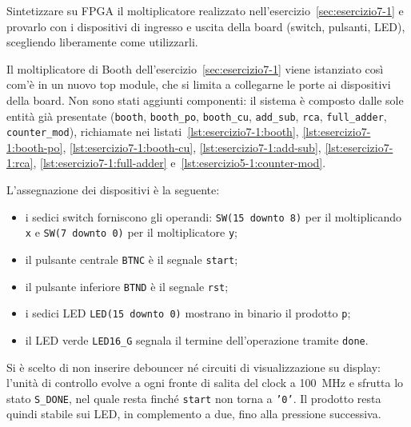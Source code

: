 \label{sec:esercizio7-2}

\begin{traccia}
Sintetizzare su FPGA il moltiplicatore realizzato nell'esercizio~\ref{sec:esercizio7-1} e provarlo con i dispositivi di ingresso e uscita della board (switch, pulsanti, LED), scegliendo liberamente come utilizzarli.
\end{traccia}

\progetto

Il moltiplicatore di Booth dell'esercizio~\ref{sec:esercizio7-1} viene istanziato così com'è in un nuovo top module, che si limita a collegarne le porte ai dispositivi della board. Non sono stati aggiunti componenti: il sistema è composto dalle sole entità già presentate (\texttt{booth}, \texttt{booth\_po}, \texttt{booth\_cu}, \texttt{add\_sub}, \texttt{rca}, \texttt{full\_adder}, \texttt{counter\_mod}), richiamate nei listati~\ref{lst:esercizio7-1:booth}, \ref{lst:esercizio7-1:booth-po}, \ref{lst:esercizio7-1:booth-cu}, \ref{lst:esercizio7-1:add-sub}, \ref{lst:esercizio7-1:rca}, \ref{lst:esercizio7-1:full-adder} e~\ref{lst:esercizio5-1:counter-mod}.

L'assegnazione dei dispositivi è la seguente:

\begin{itemize}
  \item i sedici switch forniscono gli operandi: \texttt{SW(15 downto 8)} per il moltiplicando \texttt{x} e \texttt{SW(7 downto 0)} per il moltiplicatore \texttt{y};
  \item il pulsante centrale \texttt{BTNC} è il segnale \texttt{start};
  \item il pulsante inferiore \texttt{BTND} è il segnale \texttt{rst};
  \item i sedici LED \texttt{LED(15 downto 0)} mostrano in binario il prodotto \texttt{p};
  \item il LED verde \texttt{LED16\_G} segnala il termine dell'operazione tramite \texttt{done}.
\end{itemize}

Si è scelto di non inserire debouncer né circuiti di visualizzazione su display: l'unità di controllo evolve a ogni fronte di salita del clock a \SI{100}{MHz} e sfrutta lo stato \texttt{S\_DONE}, nel quale resta finché \texttt{start} non torna a \texttt{'0'}. Il prodotto resta quindi stabile sui LED, in complemento a due, fino alla pressione successiva.

\implementazione

